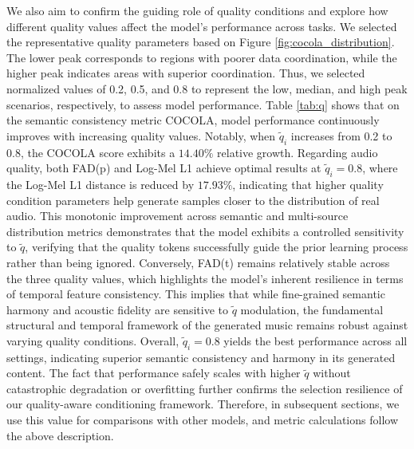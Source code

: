 \documentclass[lettersize,journal]{IEEEtran}
\begin{document}
We also aim to confirm the guiding role of quality conditions and explore how different quality values affect the model's performance across tasks. We selected the representative quality parameters based on Figure \ref{fig:cocola_distribution}. The lower peak corresponds to regions with poorer data coordination, while the higher peak indicates areas with superior coordination. Thus, we selected normalized values of 0.2, 0.5, and 0.8 to represent the low, median, and high peak scenarios, respectively, to assess model performance. Table \ref{tab:q} shows that on the semantic consistency metric COCOLA, 
model performance continuously improves with increasing quality values. Notably, when $\tilde{q}_i$ increases from 0.2 to 0.8, the COCOLA score exhibits a $14.40\%$ relative growth. Regarding audio quality, both FAD(p) and Log-Mel L1 achieve optimal results at $\tilde{q}_i = 0.8$, where the Log-Mel L1 distance is reduced by $17.93\%$,
indicating that higher quality condition parameters help generate samples closer to the distribution of real audio. This monotonic improvement across semantic and multi-source distribution metrics demonstrates that the model exhibits a controlled sensitivity to $\tilde{q}$, verifying that the quality tokens successfully guide the prior learning process rather than being ignored. Conversely, FAD(t) remains relatively stable across the three quality values, which highlights the model's inherent resilience in terms of temporal feature consistency. This implies that while fine-grained semantic harmony and acoustic fidelity are sensitive to $\tilde{q}$ modulation, the fundamental structural and temporal framework of the generated music remains robust against varying quality conditions. Overall, $\tilde{q}_i = 0.8$ yields the best performance across all settings, indicating superior semantic consistency and harmony in its generated content. The fact that performance safely scales with higher $\tilde{q}$ without catastrophic degradation or overfitting further confirms the selection resilience of our quality-aware conditioning framework. Therefore, in subsequent sections, we use this value for comparisons with other models, and metric calculations follow the above description.
\end{document}
